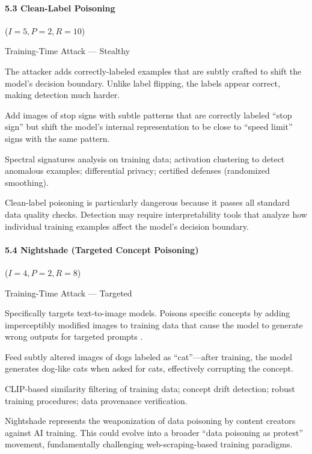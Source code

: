 \documentclass[conference]{IEEEtran}
\newenvironment{attackentry}{\begin{description}[style=unboxed,leftmargin=0cm,itemsep=1pt,parsep=1pt,topsep=2pt,font=\sffamily\small\color{accentdark}]}{\end{description}}
\begin{document}
\paragraph{5.3 Clean-Label Poisoning} ($I{=}5, P{=}2, R{=}10$)
\begin{attackentry}
\item[Category:] Training-Time Attack --- Stealthy
\item[How it works:] The attacker adds correctly-labeled examples that are subtly crafted to shift the model's decision boundary. Unlike label flipping, the labels appear correct, making detection much harder.
\item[Example:] Add images of stop signs with subtle patterns that are correctly labeled ``stop sign'' but shift the model's internal representation to be close to ``speed limit'' signs with the same pattern.
\item[Mitigations:] Spectral signatures analysis on training data; activation clustering to detect anomalous examples; differential privacy; certified defenses (randomized smoothing).
\item[Novel Inference (Reported):] Clean-label poisoning is particularly dangerous because it passes all standard data quality checks. Detection may require interpretability tools that analyze how individual training examples affect the model's decision boundary.
\end{attackentry}

\paragraph{5.4 Nightshade (Targeted Concept Poisoning)} ($I{=}4, P{=}2, R{=}8$)
\begin{attackentry}
\item[Category:] Training-Time Attack --- Targeted
\item[How it works:] Specifically targets text-to-image models. Poisons specific concepts by adding imperceptibly modified images to training data that cause the model to generate wrong outputs for targeted prompts \cite{nightshade2024}.
\item[Example:] Feed subtly altered images of dogs labeled as ``cat''---after training, the model generates dog-like cats when asked for cats, effectively corrupting the concept.
\item[Mitigations:] CLIP-based similarity filtering of training data; concept drift detection; robust training procedures; data provenance verification.
\item[Novel Inference (Observed):] Nightshade represents the weaponization of data poisoning by content creators against AI training. This could evolve into a broader ``data poisoning as protest'' movement, fundamentally challenging web-scraping-based training paradigms.
\end{attackentry}
\end{document}
